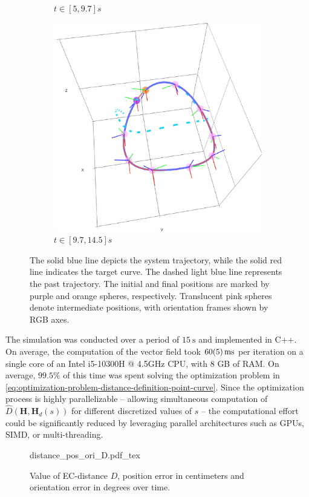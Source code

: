 \begin{figure}[ht!]
\begin{subfigure}[b]{0.32\textwidth}
        \caption{$t\in[5, 9.7]s$}
        \label{fig:vfplot-second}
    \end{subfigure}
    \hfill
    \begin{subfigure}[b]{0.32\textwidth}
        \centering
        \includegraphics[width=\textwidth]{figures/vf_automatica_3.pdf} %
        \caption{$t\in[9.7, 14.5]s$}
        \label{fig:vfplot-third}
    \end{subfigure}
    \caption{The solid blue line depicts the system trajectory, while the solid red line indicates the target curve. The dashed light blue line represents the past trajectory. The initial and final positions are marked by purple and orange spheres, respectively. Translucent pink spheres denote intermediate positions, with orientation frames shown by RGB axes.}
    \label{fig:vfplot-trajectory}
\end{figure}
The simulation was conducted over a period of $\qty{15}{\second}$ and implemented in C++. On average, the computation of the vector field took $\qty{60 \pm 5}{\milli\second}$ per iteration on a single core of an Intel i5-10300H @ 4.5GHz CPU, with 8 GB of RAM. On average, $99.5\%$ of this time was spent solving the optimization problem in \eqref{eq:optimization-problem-distance-definition-point-curve}. Since the optimization process is highly parallelizable -- allowing simultaneous computation of $\widehat{D}(\mathbf{H},\mathbf{H}_d(s))$ for different discretized values of $s$ -- the computational effort could be significantly reduced by leveraging parallel architectures such as GPUs, SIMD, or multi-threading.
\begin{figure}[ht!]
    \centering
    \def\svgwidth{\linewidth}
    {\footnotesize{distance_pos_ori_D.pdf_tex}}
    \caption{Value of EC-distance $D$, position error in centimeters and orientation error in degrees over time.}
    \label{fig:position-orientation-errors}
\end{figure}


